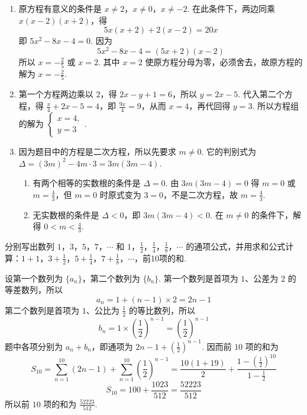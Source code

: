 \begin{solution}
\begin{enumerate}
\item 原方程有意义的条件是 \(x\neq2\)，\(x\neq0\)，\(x\neq-2\). 在此条件下，两边同乘 \(x(x-2)(x+2)\)，得
\[
5x(x+2)+2(x-2)=20x
\]
即 \(5x^2-8x-4=0\). 因为
\[
5x^2-8x-4=(5x+2)(x-2)
\]
所以 \(x=-\frac25\) 或 \(x=2\). 其中 \(x=2\) 使原方程分母为零，必须舍去，故原方程的解为 \(x=-\frac25\).
\item 第一个方程两边乘以 \(2\)，得 \(2x-y+1=6\)，所以 \(y=2x-5\). 代入第二个方程，得 \(\frac{x}{4}+2x-5=4\)，即 \(\frac{9x}{4}=9\)，从而 \(x=4\)，再代回得 \(y=3\). 所以方程组的解为 \(\begin{cases}
x=4,\\
y=3
\end{cases}\).
\item 因为题目中的方程是二次方程，所以先要求 \(m\neq0\). 它的判别式为 \(\Delta=(3m)^2-4m\cdot3=3m(3m-4)\).
\begin{enumerate}
\item 有两个相等的实数根的条件是 \(\Delta=0\). 由 \(3m(3m-4)=0\) 得 \(m=0\) 或 \(m=\frac43\)，但 \(m=0\) 时原式变为 \(3=0\)，不是二次方程，故 \(m=\frac43\).
\item 无实数根的条件是 \(\Delta<0\)，即 \(3m(3m-4)<0\). 在 \(m\neq0\) 的条件下，解得 \(0<m<\frac43\).
\end{enumerate}
\end{enumerate}
\end{solution}

\begin{problem}
分别写出数列 \(1\)，\(3\)，\(5\)，\(7\)，\(\cdots\) 和 \(1\)，\(\frac{1}{2}\)，\(\frac{1}{4}\)，\(\frac{1}{8}\)，\(\cdots\) 的通项公式，并用求和公式计算：\(1+1\)，\(3+\frac{1}{2}\)，\(5+\frac{1}{4}\)，\(7+\frac{1}{8}\)，\(\cdots\)，前10项的和.
\end{problem}

\begin{solution}
设第一个数列为 \(\{a_n\}\)，第二个数列为 \(\{b_n\}\). 第一个数列是首项为 \(1\)、公差为 \(2\) 的等差数列，所以
\[
a_n=1+(n-1)\times2=2n-1
\]
第二个数列是首项为 \(1\)、公比为 \(\frac12\) 的等比数列，所以
\[
b_n=1\times\left(\frac12\right)^{n-1}=\left(\frac12\right)^{n-1}
\]
题中各项分别为 \(a_n+b_n\)，即通项为 \(2n-1+\left(\frac12\right)^{n-1}\). 因而前 \(10\) 项的和为
\[
S_{10}=\sum_{n=1}^{10}\left(2n-1\right)+\sum_{n=1}^{10}\left(\frac12\right)^{n-1}
=\frac{10(1+19)}{2}+\frac{1-\left(\frac12\right)^{10}}{1-\frac12}
\]
\[
S_{10}=100+\frac{1023}{512}=\frac{52223}{512}
\]
所以前 \(10\) 项的和为 \(\frac{52223}{512}\).
\end{solution}

